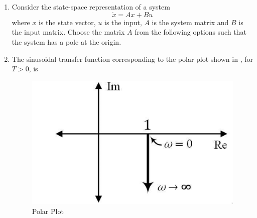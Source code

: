 \documentclass[journal,12pt,onecolumn]{IEEEtran}
\theoremstyle{remark}
\begin{document}
\begin{enumerate}
\item Consider the state-space representation of a system $$\dot{x} = A x + B u$$ where $x$ is the state vector, $u$ is the input, $A$ is the system matrix and $B$ is the input matrix. Choose the matrix $A$ from the following options such that the system has a pole at the origin.
\par\hfill{}
    \begin{enumerate}
    \end{enumerate}

\item The sinusoidal transfer function corresponding to the polar plot shown in , for $T>0$, is
\par\hfill{}
\begin{figure}[H]
    \centering
    \includegraphics[width=0.4\columnwidth]{Figs/Q-18.png}
    \caption{Polar Plot}
    \label{18}
\end{figure}
    \begin{enumerate}
    \end{enumerate}


\end{enumerate}
\end{document}
